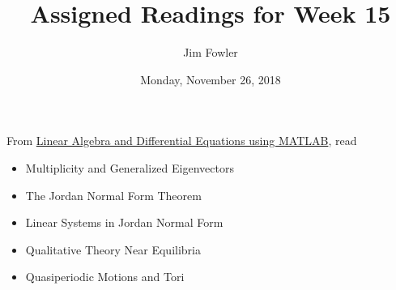 \documentclass{homework}
\author{Jim Fowler}
\title{Assigned Readings for Week 15}
\date{Monday, November 26, 2018}
\begin{document}
\maketitle

From \href{/courses/43735/files/folder/textbooks}{Linear Algebra and Differential Equations using MATLAB}, read 
\begin{itemize}
\item {} Multiplicity and Generalized Eigenvectors
\item {} The Jordan Normal Form Theorem
\item {} Linear Systems in Jordan Normal Form
\item {} Qualitative Theory Near Equilibria
\item {} Quasiperiodic Motions and Tori
\end{itemize}
\end{document}
